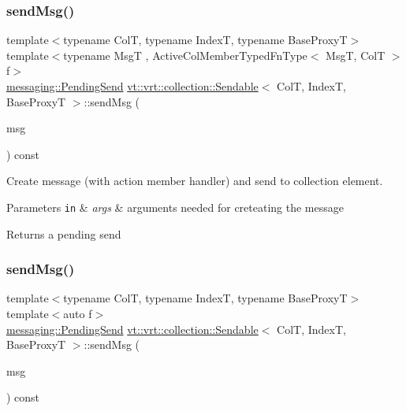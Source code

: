 \subsubsection{\texorpdfstring{send\+Msg()}{sendMsg()}\hspace{0.1cm}{\footnotesize\ttfamily [2/3]}}
{\footnotesize\ttfamily template$<$typename ColT, typename IndexT, typename Base\+ProxyT$>$ \\
template$<$typename MsgT , Active\+Col\+Member\+Typed\+Fn\+Type$<$ Msg\+T, Col\+T $>$ f$>$ \\
\hyperlink{structvt_1_1messaging_1_1_pending_send}{messaging\+::\+Pending\+Send} \hyperlink{structvt_1_1vrt_1_1collection_1_1_sendable}{vt\+::vrt\+::collection\+::\+Sendable}$<$ ColT, IndexT, Base\+ProxyT $>$\+::send\+Msg (\begin{DoxyParamCaption}\item[{\hyperlink{structvt_1_1messaging_1_1_msg_ptr_thief}{messaging\+::\+Msg\+Ptr\+Thief}$<$ MsgT $>$}]{msg }\end{DoxyParamCaption}) const}



Create message (with action member handler) and send to collection element. 


\begin{DoxyParams}[1]{Parameters}
\mbox{\tt in}  & {\em args} & arguments needed for creteating the message\\
\hline
\end{DoxyParams}
\begin{DoxyReturn}{Returns}
a pending send 
\end{DoxyReturn}
\mbox{\label{structvt_1_1vrt_1_1collection_1_1_sendable_adb5d41d0563ccc3d9b29f547d2b45687}} 
\subsubsection{\texorpdfstring{send\+Msg()}{sendMsg()}\hspace{0.1cm}{\footnotesize\ttfamily [3/3]}}
{\footnotesize\ttfamily template$<$typename ColT, typename IndexT, typename Base\+ProxyT$>$ \\
template$<$auto f$>$ \\
\hyperlink{structvt_1_1messaging_1_1_pending_send}{messaging\+::\+Pending\+Send} \hyperlink{structvt_1_1vrt_1_1collection_1_1_sendable}{vt\+::vrt\+::collection\+::\+Sendable}$<$ ColT, IndexT, Base\+ProxyT $>$\+::send\+Msg (\begin{DoxyParamCaption}\item[{\hyperlink{structvt_1_1messaging_1_1_msg_ptr_thief}{messaging\+::\+Msg\+Ptr\+Thief}$<$ typename \hyperlink{structvt_1_1_obj_func_traits}{Obj\+Func\+Traits}$<$ decltype(f)$>$\+::MsgT $>$}]{msg }\end{DoxyParamCaption}) const\hspace{0.3cm}{\ttfamily [inline]}}



